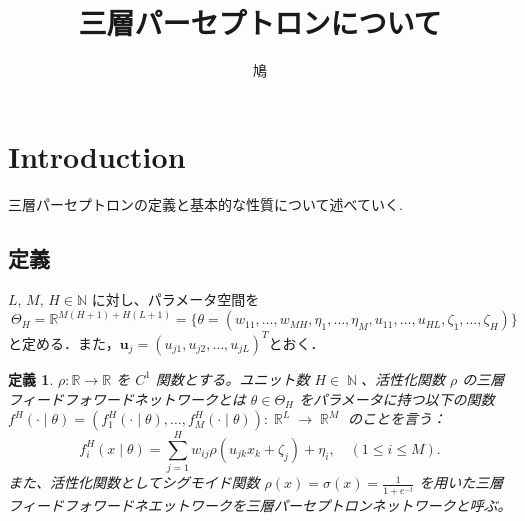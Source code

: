 \documentclass{jsarticle}
\title{三層パーセプトロンについて}
\author{鳩}
\DeclareMathOperator{\R}{\mathbb{R}}
\DeclareMathOperator{\N}{\mathbb{N}}
\newtheorem{defn}[thm]{定義}
\begin{document}
\maketitle

\section{Introduction}

三層パーセプトロンの定義と基本的な性質について述べていく.


\subsection{定義}

$L,\,M,\,H\in\mathbb{N}$ に対し、パラメータ空間を
\[
  \ \Theta_H=\mathbb{R}^{M(H+1)+H(L+1)}=\{\theta=(w_{11},\ldots,w_{MH},\eta_{1},\ldots,\eta_{M},u_{11},\ldots,u_{HL},\zeta_{1},\ldots,\zeta_{H})\}
\]
と定める．また，$\mathbf{u}_{j}=(u_{j1},u_{j2},\ldots,u_{jL})^{T}$とおく．

\begin{defn}
  $\rho : \mathbb{R}\rightarrow \mathbb{R}$ を $C^1$ 関数とする。ユニット数 $H \in \N$、活性化関数 $\rho$ の三層フィードフォワードネットワークとは $\theta \in \Theta_H$ をパラメータに持つ以下の関数 $f^H(\cdot \mid \theta) = (f_1^H(\cdot \mid \theta), \ldots, f_M^H(\cdot \mid \theta)): \R^L \rightarrow \R^M$ のことを言う：
\begin{equation*}
  f_i^H(x \mid \theta) = \sum_{j=1}^H w_{ij}\rho\left(u_{jk}x_k + \zeta_j\right) + \eta_i, \quad (1 \le i \le M).
\end{equation*}
また、活性化関数としてシグモイド関数 $\rho(x) = \sigma(x) = \frac{1}{1+e^{-t}}$ を用いた三層フィードフォワードネエットワークを三層パーセプトロンネットワークと呼ぶ。
\end{defn}
\end{document}
